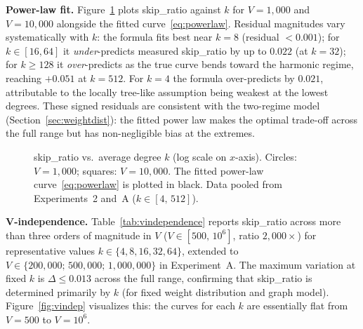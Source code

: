 \documentclass[conference]{IEEEtran}
\begin{document}
\noindent\textbf{Power-law fit.}
Figure~\ref{fig:powerlaw} plots skip\_ratio against $k$ for $V=1{,}000$
and $V=10{,}000$ alongside the fitted curve~\eqref{eq:powerlaw}.
Residual magnitudes vary systematically with $k$: the formula fits
best near $k=8$ (residual ${<}0.001$); for $k\in[16,64]$ it
\emph{under}-predicts measured skip\_ratio by up to $0.022$ (at $k=32$);
for $k\geq 128$ it \emph{over}-predicts as the true curve bends toward
the harmonic regime, reaching $+0.051$ at $k=512$.
For $k=4$ the formula over-predicts by $0.021$, attributable to the
locally tree-like assumption being weakest at the lowest degrees.
These signed residuals are consistent with the two-regime model
(Section~\ref{sec:weightdist}): the fitted power law makes the
optimal trade-off across the full range but has non-negligible bias
at the extremes.

\begin{figure}[t]
\centering
{}
\caption{skip\_ratio vs.\ average degree $k$ (log scale on $x$-axis).
Circles: $V=1{,}000$; squares: $V=10{,}000$.
The fitted power-law curve~\eqref{eq:powerlaw} is plotted in black.
Data pooled from Experiments~2 and~A ($k\in[4,\,512]$).}
\label{fig:powerlaw}
\end{figure}

\noindent\textbf{V-independence.}
Table~\ref{tab:vindependence} reports skip\_ratio across more than three
orders of magnitude in $V$ ($V\in[500,\,10^6]$, ratio $2{,}000\times$)
for representative values $k\in\{4,8,16,32,64\}$, extended to
$V\in\{200{,}000;\,500{,}000;\,1{,}000{,}000\}$ in Experiment~A.
The maximum variation at fixed $k$ is $\Delta\leq 0.013$ across the full
range, confirming that skip\_ratio is determined primarily by $k$
(for fixed weight distribution and graph model).
Figure~\ref{fig:vindep} visualizes this: the curves for each $k$
are essentially flat from $V=500$ to $V=10^6$.
\end{document}
